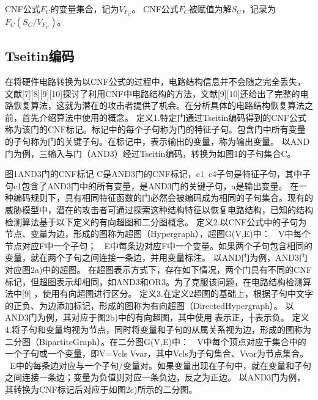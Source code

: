 CNF公式$F_C$的变量集合，记为$V_{F_C}$。
CNF公式$F_C$被赋值为解$S_C$，记录为$F_C(S_C/V_{F_C})$。

\subsection{Tseitin编码}

在将硬件电路转换为以CNF公式的过程中，电路结构信息并不会随之完全丢失，文献[7][8][9][10]探讨了利用CNF中电路结构的方法，文献[9][10]还给出了完整的电路恢复算法，这就为潜在的攻击者提供了机会。在分析具体的电路结构恢复算法之前，首先介绍算法中使用的概念。
定义1.特定门通过Tseitin编码得到的CNF公式称为该门的CNF标记。标记中的每个子句称为门的特征子句。包含门中所有变量的子句称为门的关键子句。在标记中，表示输出的变量，称为输出变量。
以AND门为例，三输入与门（AND3）经过Tseitin编码，转换为如图1的子句集合C。

图1AND3门的CNF标记
	C是AND3门的CNF标记，c1~c4子句是特征子句，其中子句c1包含了AND3门中的所有变量，是AND3门的关键子句，a是输出变量。
	在一种编码规则下，具有相同特征函数的门必然会被编码成为相同的子句集合。现有的威胁模型中，潜在的攻击者可通过探索这种结构特征以恢复电路结构，已知的结构检测算法基于以下定义的有向超图和二分图概念。
定义2.以CNF公式中的子句为节点、变量为边，形成的图称为超图（Hypergraph），超图G(V,E)中：
	V中每个节点对应F中一个子句；
	E中每条边对应F中一个变量。如果两个子句包含相同的变量，就在两个子句之间连接一条边，并用变量标注。
以AND门为例，AND3门对应图2a)中的超图。
	在超图表示方式下，存在如下情况，两个门具有不同的CNF标记，但超图表示却相同，如AND3和OR3。为了克服该问题，在电路结构检测算法中[9]  ，使用有向超图进行区分。
定义3.在定义2超图的基础上，根据子句中文字的正负、为边添加标记，形成的图称为有向超图（DirectedHypergraph）。
	以AND3门为例，其对应于图2b)中的有向超图，其中使用表示正，┼表示负。
定义4.将子句和变量均视为节点，同时将变量和子句的从属关系视为边，形成的图称为二分图（BipartiteGraph）。在二分图G(V,E)中：
	V中每个顶点对应于集合中的一个子句或一个变量，即V=VclsVvar，其中Vcls为子句集合、Vvar为节点集合。
	E中的每条边对应与一个子句/变量对。如果变量出现在子句中，就在变量和子句之间连接一条边；变量为负值则对应一条负边，反之为正边。
以AND3门为例，其转换为CNF标记后对应于如图2c)所示的二分图。

